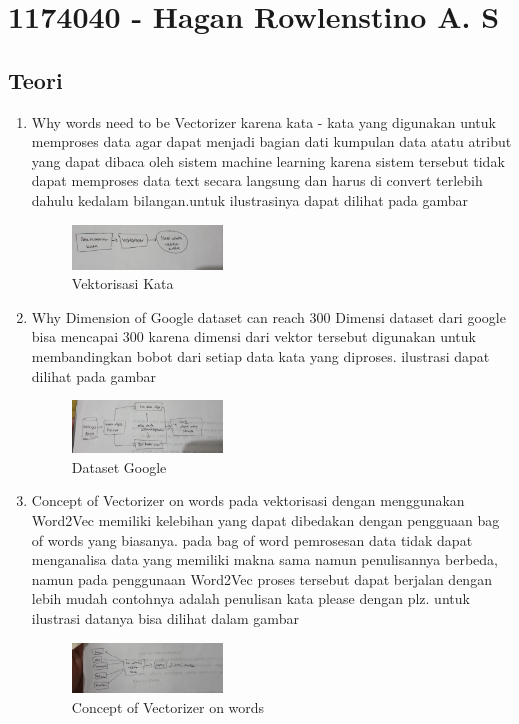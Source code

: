 \section{1174040 - Hagan Rowlenstino A. S}
    \subsection{Teori}
    \begin{enumerate}
        \item Why words need to be Vectorizer
        \subitem karena kata - kata yang digunakan untuk memproses data agar dapat menjadi bagian dati kumpulan data atatu atribut yang dapat dibaca oleh sistem machine learning karena sistem tersebut tidak dapat memproses data text secara langsung dan harus di convert terlebih dahulu kedalam bilangan.untuk ilustrasinya dapat dilihat pada gambar
        \begin{figure}[H]
            \includegraphics[width=4cm]{figures/1174040/chapter5/teori1.jpeg}
            \centering
            \caption{Vektorisasi Kata}
        \end{figure}
        
        \item Why Dimension of Google dataset can reach 300
        \subitem Dimensi dataset dari google bisa mencapai 300 karena dimensi dari vektor tersebut digunakan untuk membandingkan bobot dari setiap data kata yang diproses. ilustrasi dapat dilihat pada gambar
        \begin{figure}[H]
            \includegraphics[width=4cm]{figures/1174040/chapter5/teori2.jpeg}
            \centering
            \caption{Dataset Google}
        \end{figure}
        
        \item Concept of Vectorizer on words
        \subitem pada vektorisasi dengan menggunakan Word2Vec memiliki kelebihan yang dapat dibedakan dengan pengguaan bag of words yang biasanya.  pada bag of word pemrosesan data tidak dapat menganalisa data yang memiliki makna sama namun penulisannya berbeda, namun pada penggunaan Word2Vec proses tersebut dapat berjalan dengan lebih mudah contohnya adalah penulisan kata please dengan plz. untuk ilustrasi datanya bisa dilihat dalam gambar
        \begin{figure}[H]
            \includegraphics[width=4cm]{figures/1174040/chapter5/teori3.jpeg}
            \centering
            \caption{Concept of Vectorizer on words}
        \end{figure}
        

\end{enumerate}
